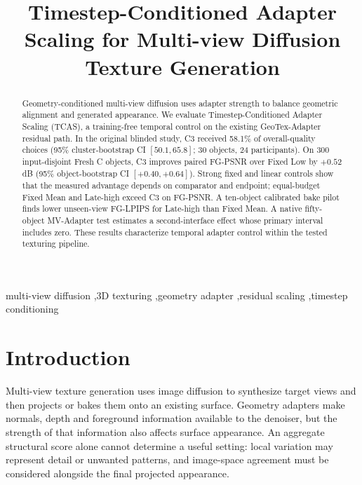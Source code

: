 \documentclass[times,twocolumn,final]{elsarticle}
\begin{document}
\begin{frontmatter}

\title{Timestep-Conditioned Adapter Scaling for Multi-view Diffusion Texture Generation}


\begin{abstract}
Geometry-conditioned multi-view diffusion uses adapter strength to balance geometric alignment and generated appearance. We evaluate Timestep-Conditioned Adapter Scaling (TCAS), a training-free temporal control on the existing GeoTex-Adapter residual path. In the original blinded study, C3 received 58.1\% of overall-quality choices (95\% cluster-bootstrap CI $[50.1,65.8]$; 30 objects, 24 participants). On 300 input-disjoint Fresh C objects, C3 improves paired FG-PSNR over Fixed Low by $+0.52$ dB (95\% object-bootstrap CI $[+0.40,+0.64]$). Strong fixed and linear controls show that the measured advantage depends on comparator and endpoint; equal-budget Fixed Mean and Late-high exceed C3 on FG-PSNR. A ten-object calibrated bake pilot finds lower unseen-view FG-LPIPS for Late-high than Fixed Mean. A native fifty-object MV-Adapter test estimates a second-interface effect whose primary interval includes zero. These results characterize temporal adapter control within the tested texturing pipeline.
\end{abstract}

\begin{keyword}
\KWD
multi-view diffusion \sep 3D texturing \sep geometry adapter \sep residual scaling \sep timestep conditioning
\end{keyword}

\end{frontmatter}

\linenumbers

\section{Introduction}
\label{sec:intro}

Multi-view texture generation uses image diffusion to synthesize target views and then projects or bakes them onto an existing surface. Geometry adapters make normals, depth and foreground information available to the denoiser, but the strength of that information also affects surface appearance. An aggregate structural score alone cannot determine a useful setting: local variation may represent detail or unwanted patterns, and image-space agreement must be considered alongside the final projected appearance.
\end{document}
